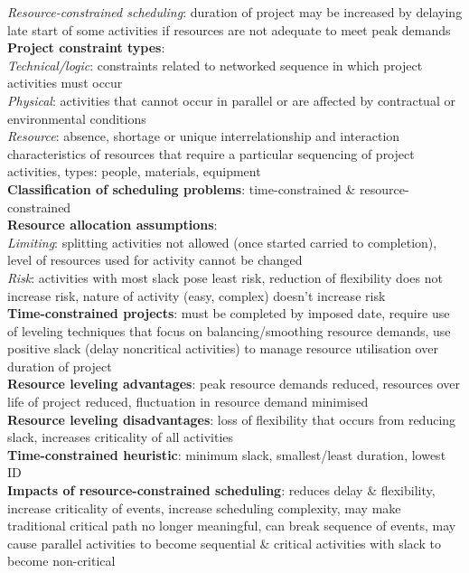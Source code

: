 \documentclass[a4paper]{article}
\begin{document}
\begin{multicols}{3}
        \textit{Resource-constrained scheduling}: duration of project may be increased by delaying late start of some activities if resources are not adequate to meet peak demands\\
        \textbf{Project constraint types}:\\
        \textit{Technical/logic}: constraints related to networked sequence in which project activities must occur\\
        \textit{Physical}: activities that cannot occur in parallel or are affected by contractual or environmental conditions\\
        \textit{Resource}: absence, shortage or unique interrelationship and interaction characteristics of resources that require a particular sequencing of project activities, types: people, materials, equipment\\
        \textbf{Classification of scheduling problems}: time-constrained \& resource-constrained\\
        \textbf{Resource allocation assumptions}:\\
        \textit{Limiting}: splitting activities not allowed (once started carried to completion), level of resources used for activity cannot be changed\\
        \textit{Risk}: activities with most slack pose least risk, reduction of flexibility does not increase risk, nature of activity (easy, complex) doesn't increase risk\\
        \textbf{Time-constrained projects}: must be completed by imposed date, require use of leveling techniques that focus on balancing/smoothing resource demands, use positive slack (delay noncritical activities) to manage resource utilisation over duration of project\\
        \textbf{Resource leveling advantages}: peak resource demands reduced, resources over life of project reduced, fluctuation in resource demand minimised\\
        \textbf{Resource leveling disadvantages}: loss of flexibility that occurs from reducing slack, increases criticality of all activities\\
        \textbf{Time-constrained heuristic}: minimum slack, smallest/least duration, lowest ID\\
        \textbf{Impacts of resource-constrained scheduling}: reduces delay \& flexibility, increase criticality of events, increase scheduling complexity, may make traditional critical path no longer meaningful, can break sequence of events, may cause parallel activities to become sequential \& critical activities with slack to become non-critical\\

\end{multicols}
\end{document}

